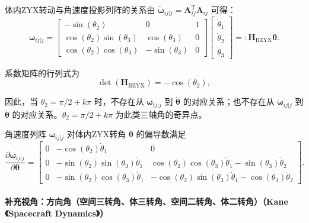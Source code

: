 体内ZYX转动与角速度投影列阵的关系\quad 由 $\tilde{\bm{\omega}}_{ij|j} = \bm{A}_{ij}^{\mathrm{T}}\dot{\bm{A}}_{ij}$ 可得：
\begin{equation}
    \bm{\omega}_{ij|j} = \begin{bmatrix}
        -\sin(\theta_2) & 0 & 1\\
        \cos(\theta_2)\sin(\theta_3) & \cos(\theta_3) & 0\\
        \cos(\theta_2)\cos(\theta_3) & -\sin(\theta_3) & 0
    \end{bmatrix}
    \begin{bmatrix}
        \dot{\theta}_1\\
        \dot{\theta}_2\\
        \dot{\theta}_3
    \end{bmatrix}
    =: \bm{H}_{\mathrm{BZYX}}\dot{\bm{\theta}}.
\end{equation}

系数矩阵的行列式为
\begin{equation}
    \det(\bm{H}_{\mathrm{BZYX}}) = -\cos(\theta_2),
\end{equation}

因此，当 $\theta_2 = \pi/2 + k\pi$ 时，不存在从 $\bm{\omega}_{ij|j}$ 到 $\dot{\bm{\theta}}$ 的对应关系；也不存在从 $\dot{\bm{\omega}}_{ij|j}$ 到 $\ddot{\bm{\theta}}$ 的对应关系。$\theta_2 = \pi/2 + k\pi$ 为此类三轴角的奇异点。

角速度列阵 $\bm{\omega}_{ij|j}$ 对体内ZYX转角 $\bm{\theta}$ 的偏导数满足
\begin{equation}
    \frac{\partial\bm{\omega}_{ij|j}}{\partial\bm{\theta}} = \begin{bmatrix}
        0 & -\cos(\theta_2)\dot{\theta}_1 & 0\\
        0 & -\sin(\theta_2)\sin(\theta_3)\dot{\theta}_1 & \cos(\theta_2)\cos(\theta_3)\dot{\theta}_1 - \sin(\theta_3)\dot{\theta}_2\\
        0 & -\sin(\theta_2)\cos(\theta_3)\dot{\theta}_1 & -\cos(\theta_2)\sin(\theta_3)\dot{\theta}_1 - \cos(\theta_3)\dot{\theta}_2
    \end{bmatrix}.
\end{equation}

%
\paragraph*{补充视角：方向角（空间三转角、体三转角、空间二转角、体二转角）（Kane《Spacecraft Dynamics》）}


